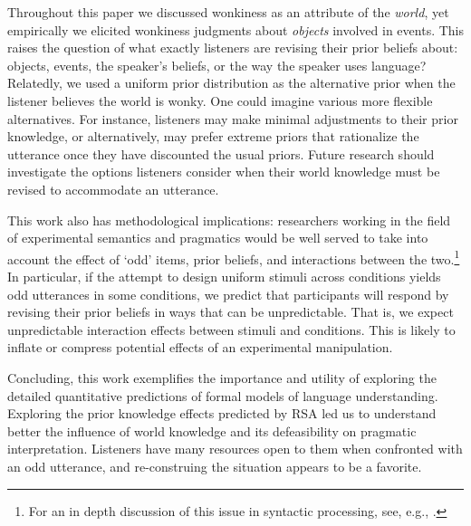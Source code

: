 \documentclass[10pt,letterpaper]{article}
\newcommand{\red}[1]{\textcolor{Red}{#1}}
\begin{document}
Throughout this paper we discussed wonkiness as an attribute of the \emph{world}, yet empirically we elicited wonkiness judgments about \emph{objects} involved in events. 
This raises the question of what exactly listeners are revising  their prior beliefs about: objects, events, the speaker's beliefs, or the way the speaker uses language? 
Relatedly, we used a uniform prior distribution as the alternative prior when the listener believes the world is wonky.  One could imagine various more flexible alternatives. For instance, listeners may make minimal adjustments to their prior knowledge, or alternatively, may prefer extreme priors that rationalize the utterance once they have discounted the usual priors.
Future research should investigate the options listeners consider when their world knowledge must be revised to accommodate an utterance.

This work also has methodological implications: researchers working in the field of experimental semantics and pragmatics would be well served to take into account the effect of `odd' items, prior beliefs, and interactions between the two.\footnote{For an in depth discussion of this issue in syntactic processing, see, e.g., .} In particular, if the attempt to design uniform stimuli across conditions yields odd utterances in some conditions, we predict that participants will respond by revising their prior beliefs in ways that can be unpredictable. That is, we expect unpredictable interaction effects between stimuli and conditions. This is likely to inflate or compress potential effects of an experimental manipulation. 

Concluding, this work exemplifies the importance and utility of exploring the detailed quantitative predictions of formal models of language understanding.
Exploring the prior knowledge effects predicted by RSA led us to understand better the influence of world knowledge and its defeasibility on pragmatic interpretation.
Listeners have many resources open to them when confronted with an odd utterance, and re-construing the situation %
appears to be a favorite.
\end{document}
